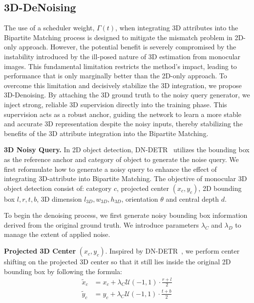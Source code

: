 \subsection{3D-DeNoising}
\label{mono3dv:3d_denoising}
The use of a scheduler weight, $\Gamma(t)$, when integrating 3D attributes into the Bipartite Matching process is designed to mitigate the mismatch problem in 2D-only approach. However, the potential benefit is severely compromised by the instability introduced by the ill-posed nature of 3D estimation from monocular images. This fundamental limitation restricts the method's impact, leading to performance that is only marginally better than the 2D-only approach. To overcome this limitation and decisively stabilize the 3D integration, we propose 3D-Denoising. By attaching the 3D ground truth to the noisy query generator, we inject strong, reliable 3D supervision directly into the training phase. This supervision acts as a robust anchor, guiding the network to learn a more stable and accurate 3D representation despite the noisy inputs, thereby stabilizing the benefits of the 3D attribute integration into the Bipartite Matching.

\noindent\textbf{3D Noisy Query.} In 2D object detection, DN-DETR~\cite{DN-DETR} utilizes the bounding box as the reference anchor and category of object to generate the noise query. We first reformulate how to generate a noisy query to enhance the effect of integrating 3D-attribute into Bipartite Matching. The objective of monocular 3D object detection consist of: category $c$, projected center $\left(x_c,y_c\right)$, 2D bounding box $l,r,t,b$, 3D dimension $l_{3D},w_{3D},h_{3D}$, orientation $\theta$ and central depth $d$.

To begin the denoising process, we first generate noisy bounding box information derived from the original ground truth. We introduce parameters $\lambda_C$ and $\lambda_D$ to manage the extent of applied noise.

\textbf{Projected 3D Center} $\left(x_c,y_c\right)$. Inspired by DN-DETR~\cite{DN-DETR}, we perform center shifting on the projected 3D center so that it still lies inside the original 2D bounding box by following the formula:
\begin{equation}
     \begin{aligned}
         \widetilde{x}_c &= x_c + \lambda_C \mathcal{U}(-1, 1) \cdot \frac{r+l}{2} \\
         \widetilde{y}_c &= y_c + \lambda_C \mathcal{U}(-1, 1) \cdot \frac{t+b}{2}
     \end{aligned}
\end{equation}

